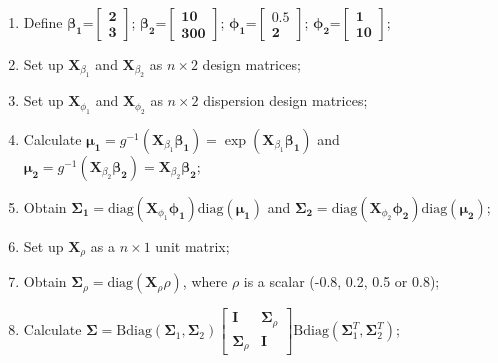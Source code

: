 \documentclass[useAMS,referee]{biom}
\begin{document}
\begin{enumerate}
\item Define	$\boldsymbol{\beta_1}$=$\begin{bmatrix}\mathbf{2}\\
\mathbf{3}
\end{bmatrix}$; $\boldsymbol{\beta_2}$=$\begin{bmatrix}\mathbf{10}\\
\mathbf{300}
\end{bmatrix}$;	
$\boldsymbol{\phi_1}$=$\begin{bmatrix}\mathbf{0.5}\\
\mathbf{2}
\end{bmatrix}$;	
$\boldsymbol{\phi_2}$=$\begin{bmatrix}\mathbf{1}\\
\mathbf{10}
\end{bmatrix}$;\\

\item Set up $\mathbf{X}_{\beta_1}$ and  $\mathbf{X}_{\beta_2}$  as  $n \times 2$ design matrices;

\item Set up  $\mathbf{X}_{\phi_1}$ and $\mathbf{X}_{\phi_2}$ as  $n \times 2$ dispersion design matrices;


\item Calculate $\boldsymbol{\mu_1} = g^{-1}(\mathbf{X}_{\beta_1}\boldsymbol{\beta_1}) = \exp(\mathbf{X}_{\beta_1}\boldsymbol{\beta_1})$ and 
$\boldsymbol{\mu_2} = g^{-1}(\mathbf{X}_{\beta_2}\boldsymbol{\beta_2}) = \mathbf{X}_{\beta_2}\boldsymbol{\beta_2}$;

\item Obtain $\boldsymbol{\Sigma_1} = \mbox{diag}(\mathbf{X}_{\phi_1} \boldsymbol{\phi_1}) \mbox{diag} (\boldsymbol{\mu_1}) $ and	
$\boldsymbol{\Sigma_2} = \mbox{diag}(\mathbf{X}_{\phi_2} \boldsymbol{\phi_2}) \mbox{diag} (\boldsymbol{\mu_2}) $;

\item Set up  $\mathbf{X}_{\rho}$ as a $n \times 1$ unit matrix; 

\item Obtain $\boldsymbol{\Sigma}_\rho=	\mbox{diag}(\mathbf{X}_\rho{\rho})$, where $\rho$ is a scalar
(-0.8, 0.2, 0.5 or 0.8);\\

\item Calculate $	\boldsymbol{\Sigma}= \mbox{Bdiag}({\boldsymbol{\Sigma}}_1, {\boldsymbol{\Sigma}}_2)
\left[\begin{array}{cc}
\mathbf{I} & \boldsymbol{\Sigma}_\rho\\
\boldsymbol{\Sigma}_\rho & \mathbf{I} \end{array} \right]
\mbox{Bdiag}({\boldsymbol{\Sigma}}_1^{T}, \boldsymbol{{\Sigma}}_2^{T})$;\\



\end{enumerate}
\end{document}

